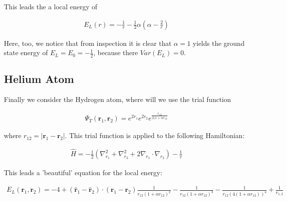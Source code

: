 This leads the a local energy of

  \begin{align}
    E_L(r) = - \frac{1}{r} - \frac{1}{2}\alpha(\alpha - \frac{2}{r})
  \end{align}
  
Here, too, we notice that from inspection it is clear that $\alpha = 1$ yields the ground state energy of $E_L = E_0 = -\frac{1}{2}$, because there $Var(E_L) = 0$. 


\subsection{Helium Atom}
Finally we consider the Hydrogen atom, where will we use the trial function 

  \begin{align}
    \Psi_T (\textbf{r}_1,\textbf{r}_2) = e^{2r_1}e^{2r_2}e^{\frac{r_{12}}{2(1+\alpha r_{12}}} 
  \end{align}

where $r_{12} = |\textbf{r}_1 - \textbf{r}_2 |$. This trial function is applied to the following Hamiltonian:
  
  \begin{align}
    \hat{H} = -\frac{1}{2}(\nabla_{r_1}^2 + \nabla_{r_3}^2 + 2\nabla_{r_1}\cdot \nabla_{r_2}) - \frac{1}{r}
  \end{align}
  
This leads a 'beautiful' equation for the local energy:

  \begin{align}
    E_L(\textbf{r}_1,\textbf{r}_2) = -4  + (\hat{\textbf{r}}_1 - \hat{\textbf{r}}_2) \cdot (\textbf{r}_1 - \textbf{r}_2) \frac{1}{r_{12}(1+\alpha r_{12})^2} -  \frac{1}{r_{12}(1+\alpha r_{12})^3} - \frac{1}{r_{12}(4(1+\alpha r_{12}))^4} + \frac{1}{r_{1,2}}   \end{align}
  
